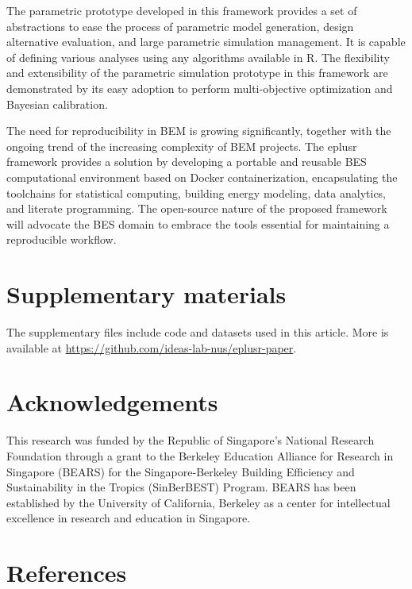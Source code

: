 \documentclass[3p, times]{elsarticle} %
\begin{document}
The parametric prototype developed in this framework provides a set of
abstractions to ease the process of parametric model generation, design
alternative evaluation, and large parametric simulation management. It is
capable of defining various analyses using any algorithms available in R. The
flexibility and extensibility of the parametric simulation prototype in this
framework are demonstrated by its easy adoption to perform multi-objective
optimization and Bayesian calibration.

The need for reproducibility in BEM is growing significantly, together with the
ongoing trend of the increasing complexity of BEM projects. The eplusr framework
provides a solution by developing a portable and reusable BES computational
environment based on Docker containerization, encapsulating the toolchains for
statistical computing, building energy modeling, data analytics, and literate
programming. The open-source nature of the proposed framework will advocate the
BES domain to embrace the tools essential for maintaining a reproducible
workflow.

\hypertarget{supplementary-materials}{%
\section*{Supplementary materials}\label{supplementary-materials}}

The supplementary files include code and datasets used in this article. More is
available at \url{https://github.com/ideas-lab-nus/eplusr-paper}.

\hypertarget{acknowledgements}{%
\section*{Acknowledgements}\label{acknowledgements}}

This research was funded by the Republic of Singapore's National Research
Foundation through a grant to the Berkeley Education Alliance for Research in
Singapore (BEARS) for the Singapore-Berkeley Building Efficiency and
Sustainability in the Tropics (SinBerBEST) Program. BEARS has been established
by the University of California, Berkeley as a center for intellectual
excellence in research and education in Singapore.

\hypertarget{references}{%
\section*{References}\label{references}}
\end{document}
